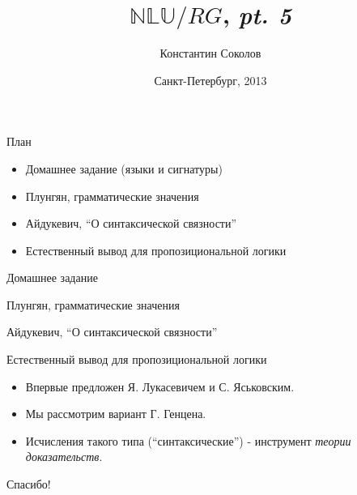 \documentclass{beamer}
\begin{document}
\title{\huge{$\mathbb{NLU}/RG$, \textit{pt. 5}}}
\author{Константин Соколов}
\date{Санкт-Петербург, 2013} 
\begin{frame}
    \thispagestyle{empty}
    \titlepage
\end{frame}

\begin{frame}{План}
    \setcounter{framenumber}{1}
    \begin{itemize}
        \item Домашнее задание (языки и сигнатуры)
        \item Плунгян, грамматические значения
        \item Айдукевич, ``О синтаксической связности''
        \item Естественный вывод для пропозициональной логики
    \end{itemize}
\end{frame}

\begin{frame}{Домашнее задание}
\end{frame}

\begin{frame}{Плунгян, грамматические значения}
\end{frame}

\begin{frame}{Айдукевич, ``О синтаксической связности''}
\end{frame}

\begin{frame}{Естественный вывод для пропозициональной логики}
\begin{itemize}
  \item Впервые предложен Я. Лукасевичем и С. Яськовским.\\
  \item Мы рассмотрим вариант Г. Генцена.\\
  \item Исчисления такого типа (``синтаксические'') - инструмент \textit{теории доказательств}.
\end{itemize}
\end{frame}



\begin{frame}{}
    \thispagestyle{empty}
    \begin{center}
        {\large Спасибо!}
    \end{center}
\end{frame}


\end{document}
